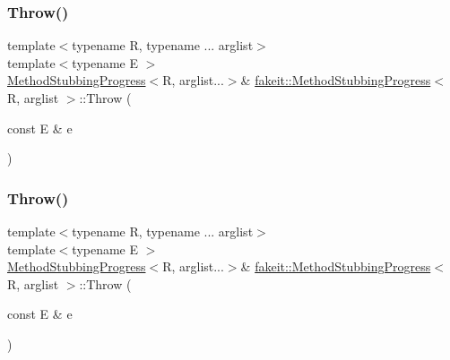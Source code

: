 \mbox{\label{structfakeit_1_1MethodStubbingProgress_ae3da30d02ba5de4bfa82f51bba5602c3}} 
\subsubsection{\texorpdfstring{Throw()}{Throw()}\hspace{0.1cm}{\footnotesize\ttfamily [15/27]}}
{\footnotesize\ttfamily template$<$typename R, typename ... arglist$>$ \\
template$<$typename E $>$ \\
\mbox{\hyperlink{structfakeit_1_1MethodStubbingProgress}{Method\+Stubbing\+Progress}}$<$R, arglist...$>$\& \mbox{\hyperlink{structfakeit_1_1MethodStubbingProgress}{fakeit\+::\+Method\+Stubbing\+Progress}}$<$ R, arglist $>$\+::Throw (\begin{DoxyParamCaption}\item[{const E \&}]{e }\end{DoxyParamCaption})\hspace{0.3cm}{\ttfamily [inline]}}

\mbox{\label{structfakeit_1_1MethodStubbingProgress_ae3da30d02ba5de4bfa82f51bba5602c3}} 
\subsubsection{\texorpdfstring{Throw()}{Throw()}\hspace{0.1cm}{\footnotesize\ttfamily [16/27]}}
{\footnotesize\ttfamily template$<$typename R, typename ... arglist$>$ \\
template$<$typename E $>$ \\
\mbox{\hyperlink{structfakeit_1_1MethodStubbingProgress}{Method\+Stubbing\+Progress}}$<$R, arglist...$>$\& \mbox{\hyperlink{structfakeit_1_1MethodStubbingProgress}{fakeit\+::\+Method\+Stubbing\+Progress}}$<$ R, arglist $>$\+::Throw (\begin{DoxyParamCaption}\item[{const E \&}]{e }\end{DoxyParamCaption})\hspace{0.3cm}{\ttfamily [inline]}}

